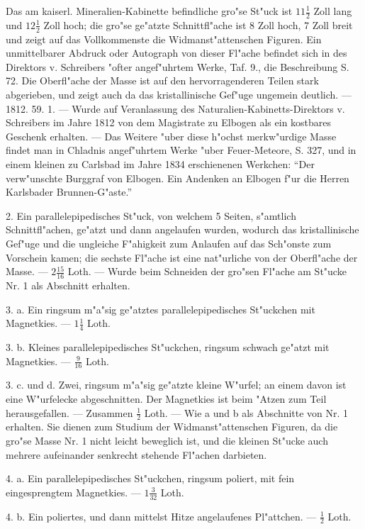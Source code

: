 \documentclass[a4paper, 11pt, oneside, polutonikogreek, german]{article}
\begin{document}
Das am kaiserl. Mineralien-Kabinette befindliche gro"se St"uck ist $11\frac{1}{2}$ Zoll lang und $12\frac{1}{2}$ Zoll hoch; die gro"se ge"atzte Schnittfl"ache ist 8 Zoll hoch, 7 Zoll breit und zeigt auf das Vollkommenste die Widmanst"attenschen Figuren. Ein unmittelbarer Abdruck oder Autograph von dieser Fl"ache befindet sich in des Direktors v. Schreibers "ofter angef"uhrtem Werke, Taf. 9., die Beschreibung S. 72. Die Oberfl"ache der Masse ist auf den hervorragenderen Teilen stark abgerieben, und zeigt auch da das kristallinische Gef"uge ungemein deutlich. --- 1812. 59. 1. --- Wurde auf Veranlassung des Naturalien-Kabinetts-Direktors v. Schreibers im Jahre 1812 von dem Magistrate zu Elbogen als ein kostbares Geschenk erhalten. --- Das Weitere "uber diese h"ochst merkw"urdige Masse findet man in Chladnis angef"uhrtem Werke "uber Feuer-Meteore, S. 327, und in einem kleinen zu Carlsbad im Jahre 1834 erschienenen Werkchen: "`Der verw"unschte Burggraf von Elbogen. Ein Andenken an Elbogen f"ur die Herren Karlsbader Brunnen-G"aste."'

2. Ein parallelepipedisches St"uck, von welchem 5 Seiten, s"amtlich Schnittfl"achen, ge"atzt und dann angelaufen wurden, wodurch das kristallinische Gef"uge und die ungleiche F"ahigkeit zum Anlaufen auf das Sch"onste zum Vorschein kamen; die sechste Fl"ache ist eine nat"urliche von der Oberfl"ache der Masse. --- $2\frac{15}{16}$ Loth. --- Wurde beim Schneiden der gro"sen Fl"ache am St"ucke Nr. 1 als Abschnitt erhalten.

3. a. Ein ringsum m"a"sig ge"atztes parallelepipedisches St"uckchen mit Magnetkies. --- $1\frac{1}{4}$ Loth.

3. b. Kleines parallelepipedisches St"uckchen, ringsum schwach ge"atzt mit Magnetkies. --- $\frac{9}{16}$ Loth.

3. c. und d. Zwei, ringsum m"a"sig ge"atzte kleine W"urfel; an einem davon ist eine W"urfelecke abgeschnitten. Der Magnetkies ist beim "Atzen zum Teil herausgefallen. --- Zusammen $\frac{1}{2}$ Loth. --- Wie a und b als Abschnitte von Nr. 1 erhalten. Sie dienen zum Studium der Widmanst"attenschen Figuren, da die gro"se Masse Nr. 1 nicht leicht beweglich ist, und die kleinen St"ucke auch mehrere aufeinander senkrecht stehende Fl"achen darbieten.

4. a. Ein parallelepipedisches St"uckchen, ringsum poliert, mit fein eingesprengtem Magnetkies. --- $1\frac{3}{32}$ Loth.

4. b. Ein poliertes, und dann mittelst Hitze angelaufenes Pl"attchen. --- $\frac{1}{2}$ Loth.
\end{document}

